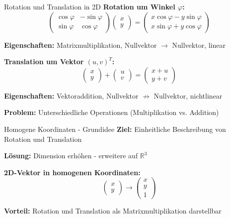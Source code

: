 \documentclass[a4paper, fontsize=7pt]{scrartcl}
\def\R{\mathbb{R}}
\begin{document}
\begin{mainbox}{Rotation und Translation in 2D}
\textbf{Rotation um Winkel $\varphi$:}
$$\begin{pmatrix} \cos\varphi & -\sin\varphi \\ \sin\varphi & \cos\varphi \end{pmatrix} \begin{pmatrix} x \\ y \end{pmatrix} = \begin{pmatrix} x\cos\varphi - y\sin\varphi \\ x\sin\varphi + y\cos\varphi \end{pmatrix}$$

\textbf{Eigenschaften:} Matrixmultiplikation, Nullvektor $\to$ Nullvektor, linear

\textbf{Translation um Vektor $(u, v)^T$:}
$$\begin{pmatrix} x \\ y \end{pmatrix} + \begin{pmatrix} u \\ v \end{pmatrix} = \begin{pmatrix} x + u \\ y + v \end{pmatrix}$$

\textbf{Eigenschaften:} Vektoraddition, Nullvektor $\not\to$ Nullvektor, nichtlinear

\textbf{Problem:} Unterschiedliche Operationen (Multiplikation vs. Addition)
\end{mainbox}

\begin{mainbox}{Homogene Koordinaten - Grundidee}
\textbf{Ziel:} Einheitliche Beschreibung von Rotation und Translation

\textbf{Lösung:} Dimension erhöhen - erweitere auf $\R^3$

\textbf{2D-Vektor in homogenen Koordinaten:}
$$\begin{pmatrix} x \\ y \end{pmatrix} \to \begin{pmatrix} x \\ y \\ 1 \end{pmatrix}$$

\textbf{Vorteil:} Rotation und Translation als Matrixmultiplikation darstellbar
\end{mainbox}
\end{document}
